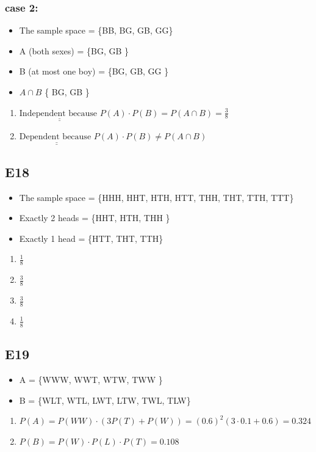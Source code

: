 \documentclass[12pt, a4paper]{article}
\begin{document}
\subsubsection*{case 2:}
\begin{itemize}
\item The sample space = \{BB, BG, GB, GG\}
\item A (both sexes) = \{BG, GB \}
\item B (at most one boy) = \{BG, GB, GG \}
\item $A \cap B$ \{ BG, GB \}
\end{itemize}

\begin{enumerate}
  \item $ \underline{\underline{ \text{Independent because }  }} P(A) \cdot P(B) = P(A \cap B) = \frac{3}{8} $ 
  \item $ \underline{\underline{ \text{Dependent because }  }} P(A) \cdot P(B) \neq P(A \cap B) $
\end{enumerate}

\subsection* {E18}

\begin{itemize}
\item The sample space = \{HHH, HHT, HTH, HTT, THH, THT, TTH, TTT\}
\item Exactly 2 heads = \{HHT, HTH, THH \}
\item Exactly 1 head = \{HTT, THT, TTH\}
\end{itemize}
\begin{enumerate}
  \item $  \frac{1}{8} $ 
  \item $  \frac{3}{8} $ 
  \item $  \frac{3}{8} $ 
  \item $  \frac{1}{8} $ 
\end{enumerate}

\subsection* {E19}

\begin{itemize}
\item A  = \{WWW, WWT, WTW, TWW \}
\item B = \{WLT, WTL, LWT, LTW, TWL, TLW\}
\end{itemize}

\begin{enumerate}
	\item $ P(A) = P(WW)\cdot (3P(T) + P(W)) = (0.6)^2 (3 \cdot 0.1 + 0.6 ) = 0.324 $ 
	\item $ P(B) = P(W) \cdot P(L)\cdot P(T) = 0.108 $
\end{enumerate}
\end{document}
